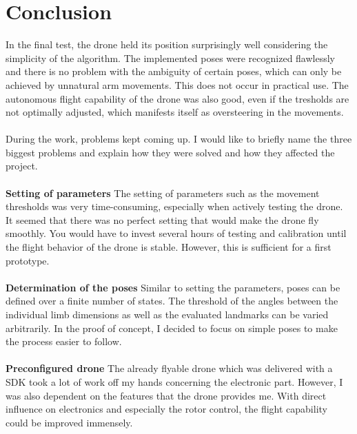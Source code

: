 \documentclass[a4paper,11pt,singlespacing]{article}
\begin{document}
\section{Conclusion}
In the final test, the drone held its position surprisingly well considering the simplicity of the algorithm.
The implemented poses were recognized flawlessly and there is no problem with the ambiguity of certain poses, which can only be achieved by unnatural arm movements.
This does not occur in practical use.
The autonomous flight capability of the drone was also good, even if the tresholds are not optimally adjusted, which manifests itself as oversteering in the movements.
\\\\
During the work, problems kept coming up.
I would like to briefly name the three biggest problems and explain how they were solved and how they affected the project.
\\\\
\textbf{Setting of parameters}
The setting of parameters such as the movement thresholds was very time-consuming, especially when actively testing the drone. It seemed that there was no perfect setting that would make the drone fly smoothly.
You would have to invest several hours of testing and calibration until the flight behavior of the drone is stable. 
However, this is sufficient for a first prototype.
\\\\
\textbf{Determination of the poses}
Similar to setting the parameters, poses can be defined over a finite number of states. The threshold of the angles between the individual limb dimensions as well as the evaluated landmarks can be varied arbitrarily.
In the proof of concept, I decided to focus on simple poses to make the process easier to follow.
\\\\
\textbf{Preconfigured drone}
The already flyable drone which was delivered with a SDK took a lot of work off my hands concerning the electronic part.
However, I was also dependent on the features that the drone provides me.
With direct influence on electronics and especially the rotor control, the flight capability could be improved immensely.
\pagebreak
\end{document}
